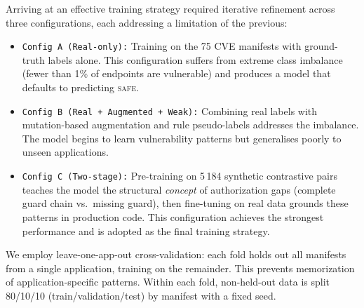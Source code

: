 Arriving at an effective training strategy required iterative refinement
across three configurations, each addressing a limitation of the previous:
\begin{itemize}
    \item \texttt{Config A (Real-only):} Training on the 75 CVE manifests with
    ground-truth labels alone. This configuration suffers from extreme class
    imbalance (fewer than 1\% of endpoints are vulnerable) and produces a
    model that defaults to predicting \textsc{safe}.
    \item \texttt{Config B (Real + Augmented + Weak):} Combining real labels with
    mutation-based augmentation and rule pseudo-labels addresses the
    imbalance. The model begins to learn vulnerability patterns but
    generalises poorly to unseen applications.
    \item \texttt{Config C (Two-stage):} Pre-training on 5\,184 synthetic
    contrastive pairs teaches the model the structural \emph{concept} of
    authorization gaps (complete guard chain vs.\ missing guard), then
    fine-tuning on real data grounds these patterns in production code.
    This configuration achieves the strongest performance and is adopted
    as the final training strategy.
\end{itemize}


We employ leave-one-app-out cross-validation: each fold holds out all
manifests from a single application, training on the remainder. This
prevents memorization of application-specific patterns. Within each fold,
non-held-out data is split 80/10/10 (train/validation/test) by manifest
with a fixed seed.


